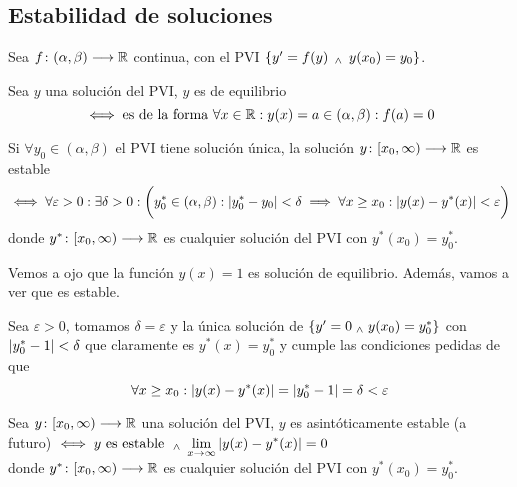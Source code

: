 \subsection{Estabilidad de soluciones}

Sea $f \colon (\alpha,\beta) \longrightarrow \mathbb{R}$ continua, con el PVI $\{y'=f(y) \, \; _{\wedge} \; \, y(x_0) = y_0\}$.
\begin{defn}[Equilibrio]
	Sea $y$ una solución del PVI, $y$ es de equilibrio
	\[\iff \text{es de la forma } \forall x \in \mathbb{R} : y(x)=a \in (\alpha, \beta) : f(a) = 0\]
\end{defn}

\begin{defn}[Estabilidad]
	Si $\forall y_0 \in (\alpha, \beta)$ el PVI tiene solución única, la solución $y \colon [x_0, \infty) \longrightarrow \mathbb{R}$ es estable
	\[\iff \forall \varepsilon >0 : \exists \delta > 0 : \bigg(y_0^*\in (\alpha, \beta) : \left|y_0^*-y_0\right| < \delta \implies \forall x \geq x_0 :\left|y(x)-y^*(x)\right|<\varepsilon\bigg)\]
	donde $y^* \colon [x_0, \infty) \longrightarrow \mathbb{R}$ es cualquier solución del PVI con $y^*(x_0)=y_0^*$.
\end{defn}

\begin{ejem}[$\{y'=0 \we y(x_0)=1\}$]
	Vemos a ojo que la función $y(x)=1$ es solución de equilibrio. Además, vamos a ver que es estable.

	Sea $\varepsilon > 0$, tomamos $\delta = \varepsilon$ y la única solución de $\{y'=0 \; _{\wedge} \; y(x_0) = y_0^*\}$ con $\left|y_0^* -1\right| < \delta$ que claramente es $y^*(x) = y_0^*$ y cumple las condiciones pedidas de que \[\forall x \geq x_0 : \left|y(x) - y^*(x)\right| = \left|y_0^* - 1\right| = \delta < \varepsilon\]
\end{ejem}

\begin{defn}
	Sea $y \colon [x_0, \infty) \longrightarrow \mathbb{R}$ una solución del PVI, $y$ es asintóticamente estable (a futuro) $\displaystyle \iff y \text{ es estable } \; _{\wedge} \; \lim_{x\to \infty}\left|y(x)-y^*(x)\right|=0$ \\
	donde $y^* \colon [x_0, \infty) \longrightarrow \mathbb{R}$ es cualquier solución del PVI con $y^*(x_0)=y_0^*$.
\end{defn}

